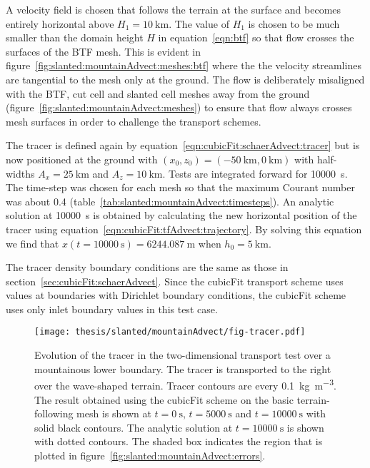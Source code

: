 A velocity field is chosen that follows the terrain at the surface and becomes entirely horizontal above $H_1 = \SI{10}{\kilo\meter}$.
The value of $H_1$ is chosen to be much smaller than the domain height $H$ in equation~\eqref{eqn:btf} so that flow crosses the surfaces of the BTF mesh.
This is evident in figure~\ref{fig:slanted:mountainAdvect:meshes:btf} where the the velocity streamlines are tangential to the mesh only at the ground.
The flow is deliberately misaligned with the BTF, cut cell and slanted cell meshes away from the ground (figure~\ref{fig:slanted:mountainAdvect:meshes}) to ensure that flow always crosses mesh surfaces in order to challenge the transport schemes.

\begin{table}
	\centering
	
%
	\caption{Time-steps (\si{\second}) for the two-dimensional transport test over a mountainous lower boundary.  The time-steps were chosen so that the maximum Courant number was between \num{0.36} and \num{0.46}.}
	\label{tab:slanted:mountainAdvect:timesteps}
\end{table}

The tracer is defined again by equation~\eqref{eqn:cubicFit:schaerAdvect:tracer} but is now positioned at the ground with $(x_0, z_0) = (\SI{-50}{\kilo\meter}, \SI{0}{\kilo\meter})$ with half-widths $A_x = \SI{25}{\kilo\meter}$ and $A_z = \SI{10}{\kilo\meter}$.
Tests are integrated forward for \SI{10000}{\second}.  The time-step was chosen for each mesh so that the maximum Courant number was about \num{0.4} (table~\ref{tab:slanted:mountainAdvect:timesteps}).
An analytic solution at \SI{10000}{\second} is obtained by calculating the new horizontal position of the tracer using equation~\eqref{eqn:cubicFit:tfAdvect:trajectory}.
By solving this equation we find that \(x(t=\SI{10000}{\second}) = \SI{6244.087}{\meter}\) when $h_0 = \SI{5}{\kilo\meter}$.

The tracer density boundary conditions are the same as those in section~\ref{sec:cubicFit:schaerAdvect}.
Since the cubicFit transport scheme uses values at boundaries with Dirichlet boundary conditions, the cubicFit scheme uses only inlet boundary values in this test case.

\begin{figure}
	\centering
	\texttt{[image: thesis/slanted/mountainAdvect/fig-tracer.pdf]}
	\caption{Evolution of the tracer in the two-dimensional transport test over a mountainous lower boundary.  The tracer is transported to the right over the wave-shaped terrain.  Tracer contours are every \SI{0.1}{\kilo\gram\per\meter\cubed}.  The result obtained using the cubicFit scheme on the basic terrain-following mesh is shown at $t=\SI{0}{\second}$, $t=\SI{5000}{\second}$ and $t=\SI{10000}{\second}$ with solid black contours. The analytic solution at $t=\SI{10000}{\second}$ is shown with dotted contours.
	The shaded box indicates the region that is plotted in figure~\ref{fig:slanted:mountainAdvect:errors}.}
	\label{fig:slanted:mountainAdvect:tracer}
\end{figure}

